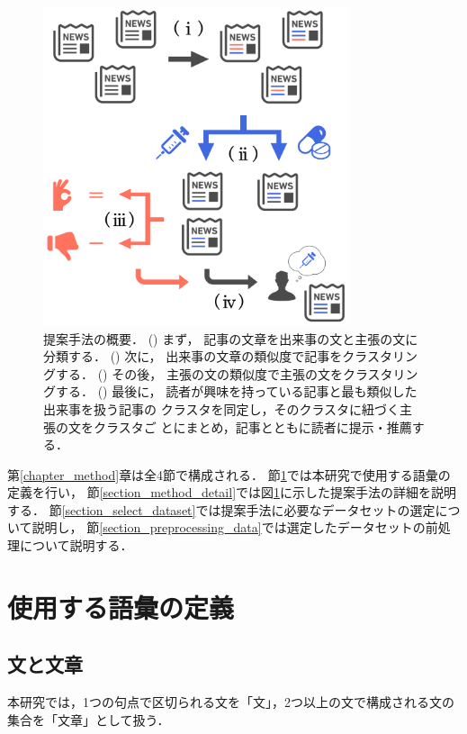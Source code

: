\documentclass[12pt,a4j,dvipdfmx]{jreport}
\begin{document}
\begin{figure}[H]
	\centering
	\includegraphics[keepaspectratio, width=90mm]{img/method_abstract_v02.png}
	\caption{
    提案手法の概要．
    ()
    まず，
    記事の文章を出来事の文と主張の文に分類する．
    ()
    次に，
    出来事の文章の類似度で記事をクラスタリングする．
    ()
    その後，
    主張の文の類似度で主張の文をクラスタリングする．
    ()
    最後に，
    読者が興味を持っている記事と最も類似した出来事を扱う記事の
    クラスタを同定し，そのクラスタに紐づく主張の文をクラスタご
    とにまとめ，記事とともに読者に提示・推薦する．
  }
	\label{fig_method_abstract}
\end{figure}

\newpage

第\ref{chapter_method}章は全4節で構成される．
節\ref{section_term_definition}では本研究で使用する語彙の定義を行い，
節\ref{section_method_detail}では図\ref{fig_method_abstract}に示した提案手法の詳細を説明する．
節\ref{section_select_dataset}では提案手法に必要なデータセットの選定について説明し，
節\ref{section_preprocessing_data}では選定したデータセットの前処理について説明する．

\section{使用する語彙の定義}
\label{section_term_definition}

\subsection{文と文章}
本研究では，1つの句点で区切られる文を「文」，2つ以上の文で構成される文の集合を「文章」として扱う．
\end{document}

